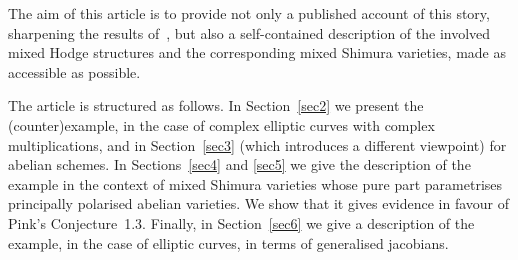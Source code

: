 \documentclass[JEP,XML,SOM,Unicode,NoFloatCountersInSection]{cedram}
\theoremstyle{plain}
\theoremstyle{definition}
\numberwithin{equation}{subsection}
\begin{document}
The aim of this article is to provide not only a published account of
this story, sharpening the results of~\cite{Bertrand11}, but also a
self-contained description of the involved mixed Hodge structures and
the corresponding mixed Shimura varieties, made as accessible as
possible.

The article is structured as follows. In Section~\ref{sec2} we present
the (counter)example, in the case of complex elliptic curves with
complex multiplications, and in Section~\ref{sec3} (which introduces a
different viewpoint) for abelian schemes. In Sections~\ref{sec4} and
\ref{sec5} we give the description of the example in the context of
mixed Shimura varieties whose pure part parametrises principally
polarised abelian varieties. We show that it gives evidence in favour of
Pink's Conjecture~1.3. Finally, in Section~\ref{sec6} we give a description
of the example, in the case of elliptic curves, in terms of
generalised jacobians.
\end{document}
